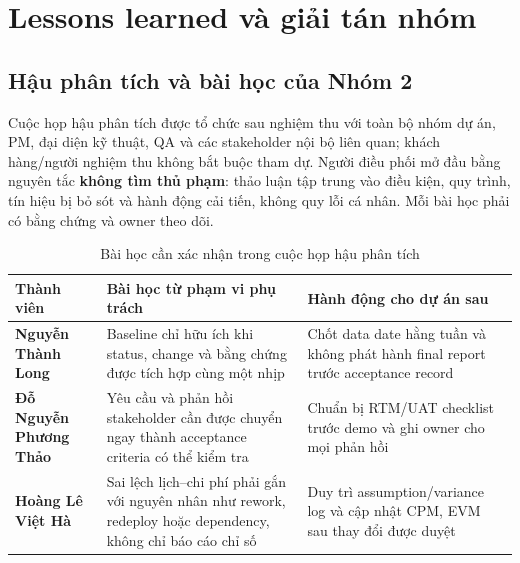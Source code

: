 \section{Lessons learned và giải tán nhóm}

\subsection{Hậu phân tích và bài học của Nhóm 2}

Cuộc họp hậu phân tích được tổ chức sau nghiệm thu với toàn bộ nhóm dự án, PM, đại diện kỹ thuật, QA và các stakeholder nội bộ liên quan; khách hàng/người nghiệm thu không bắt buộc tham dự. Người điều phối mở đầu bằng nguyên tắc \textbf{không tìm thủ phạm}: thảo luận tập trung vào điều kiện, quy trình, tín hiệu bị bỏ sót và hành động cải tiến, không quy lỗi cá nhân. Mỗi bài học phải có bằng chứng và owner theo dõi.

\begin{table}[H]
\centering
\caption{Bài học cần xác nhận trong cuộc họp hậu phân tích}
\label{tab:student-lessons-learned}
\begin{tabularx}{\textwidth}{| >{\bfseries}p{3.2cm} | p{5.1cm} | X |}
\hline
Thành viên & Bài học từ phạm vi phụ trách & Hành động cho dự án sau \\
\hline
Nguyễn Thành Long & Baseline chỉ hữu ích khi status, change và bằng chứng được tích hợp cùng một nhịp & Chốt data date hằng tuần và không phát hành final report trước acceptance record \\ \hline
Đỗ Nguyễn Phương Thảo & Yêu cầu và phản hồi stakeholder cần được chuyển ngay thành acceptance criteria có thể kiểm tra & Chuẩn bị RTM/UAT checklist trước demo và ghi owner cho mọi phản hồi \\ \hline
Hoàng Lê Việt Hà & Sai lệch lịch--chi phí phải gắn với nguyên nhân như rework, redeploy hoặc dependency, không chỉ báo cáo chỉ số & Duy trì assumption/variance log và cập nhật CPM, EVM sau thay đổi được duyệt \\
\hline
\end{tabularx}
\end{table}

